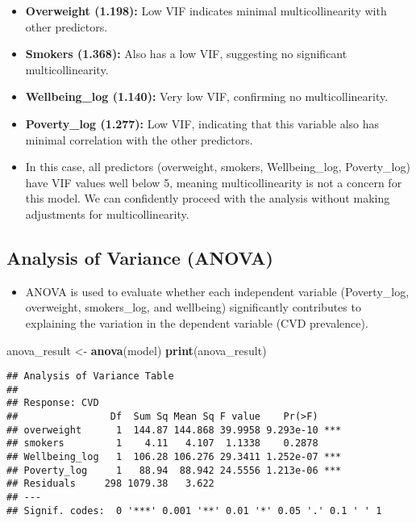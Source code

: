 \documentclass[
]{article}
\newenvironment{Shaded}{\begin{snugshade}}{\end{snugshade}}
\newcommand{\FunctionTok}[1]{\textcolor[rgb]{0.13,0.29,0.53}{\textbf{#1}}}
\newcommand{\NormalTok}[1]{#1}
\newcommand{\OtherTok}[1]{\textcolor[rgb]{0.56,0.35,0.01}{#1}}
\providecommand{\tightlist}{%
  \setlength{\itemsep}{0pt}\setlength{\parskip}{0pt}}
\begin{document}
\begin{itemize}
\tightlist
\item
  \textbf{Overweight (1.198):} Low VIF indicates minimal
  multicollinearity with other predictors.
\item
  \textbf{Smokers (1.368):} Also has a low VIF, suggesting no
  significant multicollinearity.
\item
  \textbf{Wellbeing\_log (1.140):} Very low VIF, confirming no
  multicollinearity.
\item
  \textbf{Poverty\_log (1.277):} Low VIF, indicating that this variable
  also has minimal correlation with the other predictors.
\item
  In this case, all predictors (overweight, smokers, Wellbeing\_log,
  Poverty\_log) have VIF values well below 5, meaning multicollinearity
  is not a concern for this model. We can confidently proceed with the
  analysis without making adjustments for multicollinearity.
\end{itemize}

\subsection{Analysis of Variance
(ANOVA)}\label{analysis-of-variance-anova}

\begin{itemize}
\tightlist
\item
  ANOVA is used to evaluate whether each independent variable
  (Poverty\_log, overweight, smokers\_log, and wellbeing) significantly
  contributes to explaining the variation in the dependent variable (CVD
  prevalence).
\end{itemize}

\begin{Shaded}
\begin{Highlighting}[]
\NormalTok{anova\_result }\OtherTok{\textless{}{-}} \FunctionTok{anova}\NormalTok{(model)}
\FunctionTok{print}\NormalTok{(anova\_result)}
\end{Highlighting}
\end{Shaded}

\begin{verbatim}
## Analysis of Variance Table
## 
## Response: CVD
##                Df  Sum Sq Mean Sq F value    Pr(>F)    
## overweight      1  144.87 144.868 39.9958 9.293e-10 ***
## smokers         1    4.11   4.107  1.1338    0.2878    
## Wellbeing_log   1  106.28 106.276 29.3411 1.252e-07 ***
## Poverty_log     1   88.94  88.942 24.5556 1.213e-06 ***
## Residuals     298 1079.38   3.622                      
## ---
## Signif. codes:  0 '***' 0.001 '**' 0.01 '*' 0.05 '.' 0.1 ' ' 1
\end{verbatim}
\end{document}
